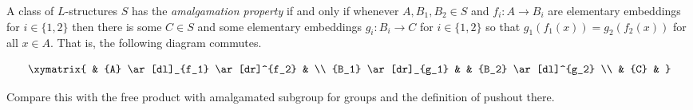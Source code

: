 \documentclass[12pt]{article}
\def\ra{\rightarrow}
\begin{document}
A class of $L$-structures $S$ has the {\em amalgamation property} if and only if
whenever $A,B_{1},B_{2} \in S$ and  $f_{i}:A \ra B_{i}$ are elementary embeddings 
for $i \in \{1,2\}$ then there is some $C \in S$ and some elementary embeddings 
$g_{i}:B_{i} \ra C$ for $i \in \{1,2\}$ so that $g_{1}(f_{1}(x))=g_{2}(f_{2}(x))$ 
for all $x \in A$. That is, the following diagram commutes.

$$\xymatrix{
& {A} \ar[dl]_{f_1} \ar[dr]^{f_2} & \\
{B_1} \ar[dr]_{g_1} & & {B_2} \ar[dl]^{g_2} \\
& {C} & 
}
$$


Compare this with the free product with amalgamated subgroup for groups and 
the definition of pushout  there.
\end{document}
